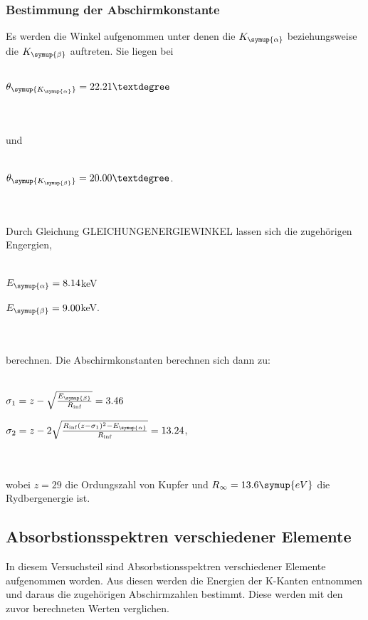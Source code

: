     \subsubsection{Bestimmung der Abschirmkonstante}
        Es werden die Winkel aufgenommen unter denen die $K_{\symup{\alpha}}$ beziehungsweise die $K_{\symup{\beta}}$ auftreten.
        Sie liegen bei
        \\ \\
        \centerline{$\theta_{\symup{K_{\symup{\alpha}}}} = 22.21°$}
        \\ \\
        und 
        \\ \\
        \centerline{$\theta_{\symup{K_{\symup{\beta}}}} = 20.00°$.}
        \\ \\
        Durch Gleichung GLEICHUNGENERGIEWINKEL lassen sich die zugehörigen Engergien, 
        \\ \\
        \centerline{$E_{\symup{\alpha}} = 8.14 $keV}
        \centerline{$E_{\symup{\beta}} = 9.00 $keV.}
        \\ \\
        berechnen.
        Die Abschirmkonstanten berechnen sich dann zu:
        \\ \\
        \centerline{$\sigma_1 = z - \sqrt{\frac{E_{\symup{\beta}}}{R_{\inf}} } = 3.46 $}
        \centerline{$\sigma_2 = z - 2 \sqrt{\frac{R_{\inf}(z - \sigma_1)^2 - E_{\symup{\alpha}}}{R_{\inf}}} = 13.24 $,}
        \\ \\
        wobei $z = 29$ die Ordungszahl von Kupfer und $R_{\infty} = 13.6 \symup{eV}$ die Rydbergenergie ist.
\subsection{Absorbstionsspektren verschiedener Elemente}    
    In diesem Versuchsteil sind Absorbstionsspektren verschiedener Elemente aufgenommen worden. Aus diesen werden die Energien der 
    K-Kanten entnommen und daraus die zugehörigen Abschirmzahlen bestimmt. Diese werden mit den zuvor berechneten Werten verglichen.
        





